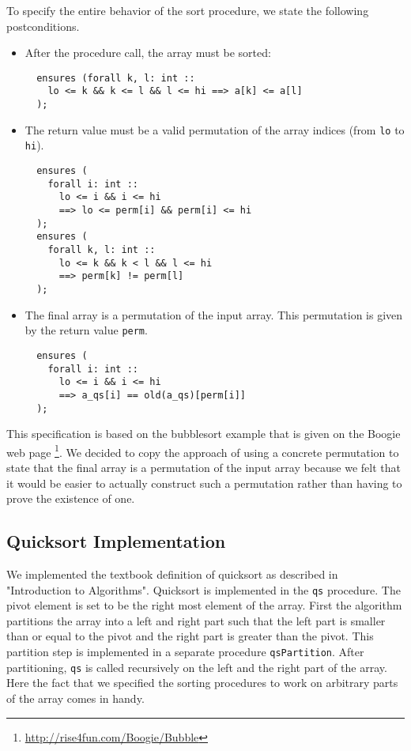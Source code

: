 To specify the entire behavior of the sort procedure, we state the following postconditions.
\begin{itemize}
\item After the procedure call, the array must be sorted:
  \begin{verbatim}
  ensures (forall k, l: int :: 
    lo <= k && k <= l && l <= hi ==> a[k] <= a[l]
  );
\end{verbatim}

\item The return value must be a valid permutation of the array indices (from \texttt{lo} to \texttt{hi}).
  \begin{verbatim}
  ensures (
    forall i: int :: 
      lo <= i && i <= hi 
      ==> lo <= perm[i] && perm[i] <= hi
  );
  ensures (
    forall k, l: int :: 
      lo <= k && k < l && l <= hi 
      ==> perm[k] != perm[l]
  );
\end{verbatim}

\item The final array is a permutation of the input array. This permutation is given by the return value \texttt{perm}.
  \begin{verbatim}
  ensures (
    forall i: int :: 
      lo <= i && i <= hi 
      ==> a_qs[i] == old(a_qs)[perm[i]]
  );
\end{verbatim}
 
\end{itemize}

This specification is based on the bubblesort example that is 
given on the Boogie web page \footnote{\url{http://rise4fun.com/Boogie/Bubble}}. We decided to 
copy the approach of using a concrete permutation to state that the final array is a permutation of
the input array because we felt that it would be easier to actually construct such a permutation rather
than having to prove the existence of one.

\subsection{Quicksort Implementation}

We implemented the textbook definition of quicksort as described in "Introduction to Algorithms"\cite{Cormen}. 
Quicksort is implemented in the \texttt{qs} procedure. The pivot element is set to be the right most
element of the array. 
First the algorithm partitions the array into a left and right part such that the left part is smaller than or equal to
the pivot and the right part is greater than the pivot. 
This partition step is implemented in a separate procedure \texttt{qsPartition}.
After partitioning, \texttt{qs} is called recursively on the left and the right part of the array. Here
the fact that we specified the sorting procedures to work on arbitrary parts of the array comes in handy.\\

